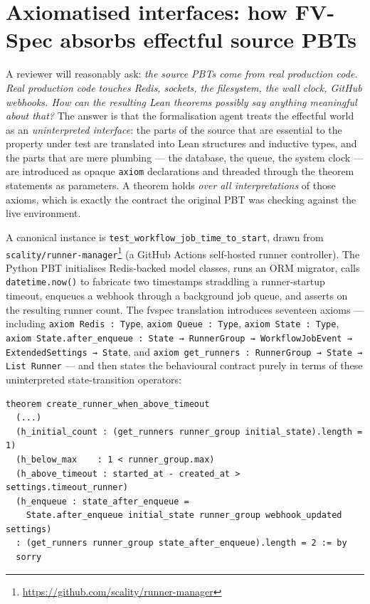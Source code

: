 \section{Axiomatised interfaces: how FV-Spec absorbs effectful source PBTs}

A reviewer will reasonably ask: \emph{the source PBTs come from real
production code. Real production code touches Redis, sockets, the
filesystem, the wall clock, GitHub webhooks. How can the resulting Lean
theorems possibly say anything meaningful about that?} The answer is
that the formalisation agent treats the effectful world as an
\emph{uninterpreted interface}: the parts of the source that are
essential to the property under test are translated into Lean
structures and inductive types, and the parts that are mere plumbing
--- the database, the queue, the system clock --- are introduced as
opaque \lstinline{axiom} declarations and threaded through the theorem
statements as parameters. A theorem holds \emph{over all
interpretations} of those axioms, which is exactly the contract the
original PBT was checking against the live environment.

A canonical instance is \texttt{test\_workflow\_job\_time\_to\_start},
drawn from \texttt{scality/runner-manager}\footnote{\url{https://github.com/scality/runner-manager}}
(a GitHub Actions self-hosted runner controller). The Python PBT
initialises Redis-backed model classes, runs an ORM migrator, calls
\lstinline{datetime.now()} to fabricate two timestamps straddling a
runner-startup timeout, enqueues a webhook through a background job
queue, and asserts on the resulting runner count. The fvspec
translation introduces seventeen axioms --- including
\lstinline{axiom Redis : Type}, \lstinline{axiom Queue : Type},
\lstinline{axiom State : Type},
\lstinline{axiom State.after_enqueue : State → RunnerGroup → WorkflowJobEvent → ExtendedSettings → State},
and
\lstinline{axiom get_runners : RunnerGroup → State → List Runner}
--- and then states the behavioural contract purely in terms of these
uninterpreted state-transition operators:

\begin{lstlisting}[language=Lean,basicstyle=\ttfamily\small,frame=single]
theorem create_runner_when_above_timeout
  (...)
  (h_initial_count : (get_runners runner_group initial_state).length = 1)
  (h_below_max    : 1 < runner_group.max)
  (h_above_timeout : started_at - created_at > settings.timeout_runner)
  (h_enqueue : state_after_enqueue =
    State.after_enqueue initial_state runner_group webhook_updated settings)
  : (get_runners runner_group state_after_enqueue).length = 2 := by
  sorry
\end{lstlisting}

